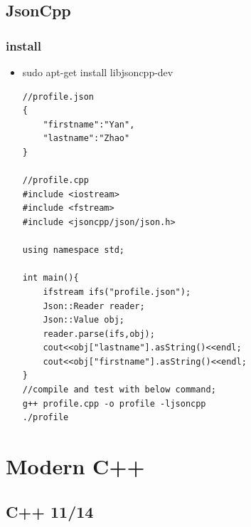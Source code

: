 \documentclass[a4paper,11pt,twoside]{book}
\begin{document}
\section{JsonCpp}
\subsection{install}
\begin{itemize}
    \item sudo apt-get install libjsoncpp-dev
\begin{lstlisting}[]
//profile.json
{
    "firstname":"Yan",
    "lastname":"Zhao"
}

//profile.cpp
#include <iostream>
#include <fstream>
#include <jsoncpp/json/json.h>

using namespace std;

int main(){
    ifstream ifs("profile.json");
    Json::Reader reader;
    Json::Value obj;
    reader.parse(ifs,obj);
    cout<<obj["lastname"].asString()<<endl;
    cout<<obj["firstname"].asString()<<endl;
}
//compile and test with below command;
g++ profile.cpp -o profile -ljsoncpp
./profile
\end{lstlisting}
\end{itemize}

\fi

\chapter{Modern C++}
\section{C++ 11/14}
\end{document}
